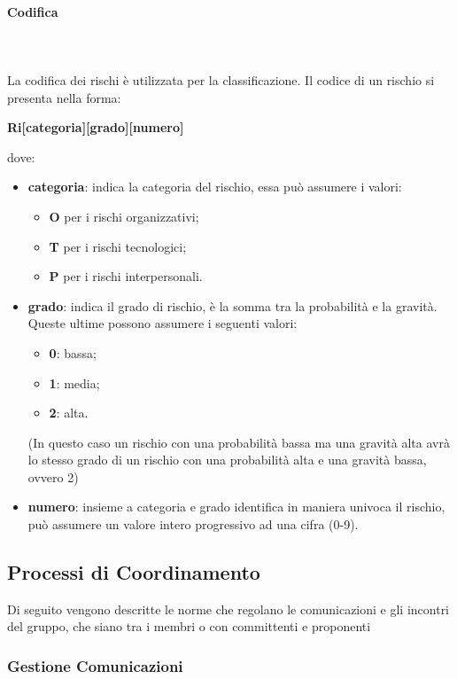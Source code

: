 \paragraph{Codifica}\mbox{} \\ \mbox{} \\
La codifica dei rischi è utilizzata per la classificazione. Il codice di un rischio si presenta nella forma: \\
\centerline{\textbf{Ri[categoria][grado][numero]}}
dove:
\begin{itemize}
	\item \textbf{categoria}: indica la categoria del rischio, essa può assumere i valori:
	\begin{itemize}
		\item \textbf{O} per i rischi organizzativi;
		\item \textbf{T} per i rischi tecnologici;
		\item \textbf{P} per i rischi interpersonali.
	\end{itemize}
	\item \textbf{grado}: indica il grado di rischio, è la somma tra la probabilità e la gravità. Queste ultime possono assumere i seguenti valori:
	\begin{itemize}
		\item \textbf{0}: bassa;
		\item \textbf{1}: media;
		\item \textbf{2}: alta.
	\end{itemize}
	(In questo caso un rischio con una probabilità bassa ma una gravità alta avrà lo stesso grado di un rischio con una probabilità alta e una gravità bassa, ovvero 2)
	\item \textbf{numero}: insieme a categoria e grado identifica in maniera univoca il rischio, può assumere un valore intero progressivo ad una cifra (0-9).
\end{itemize}

\subsection{Processi di Coordinamento}
Di seguito vengono descritte le norme che regolano le comunicazioni e gli incontri del gruppo, che siano tra i membri o con committenti e proponenti
\subsubsection{Gestione Comunicazioni}
